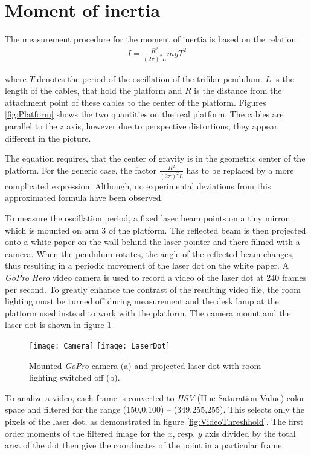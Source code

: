 \documentclass[journal]{IEEEtran}
\begin{document}
\section{Moment of inertia}

The measurement procedure for the moment of inertia is based on the relation \cite{report:ernest}
\begin{align}
	I = \frac{R^2}{(2\pi)^2 L} m g T^2
	\label{eq:I}
\end{align}

where $T$ denotes the period of the oscillation of the trifilar pendulum. $L$ is the length of the cables, that hold the platform and $R$ is the distance from the attachment point of these cables to the center of the platform. Figures \ref{fig:Platform} shows the two quantities on the real platform. The cables are parallel to the $z$ axis, however due to perspective distortions, they appear different in the picture.

The equation requires, that the center of gravity is in the geometric center of the platform.
For the generic case, the factor $\frac{R^2}{(2\pi)^2 L}$ has to be replaced by a more complicated expression.
Although, no experimental deviations from this approximated formula have been observed.

To measure the oscillation period, a fixed laser beam points on a tiny mirror, which is mounted on arm 3 of the platform.
The reflected beam is then projected onto a white paper on the wall behind the laser pointer and there filmed with a camera. 
When the pendulum rotates, the angle of the reflected beam changes, thus resulting in a periodic movement of the laser dot on the white paper.
A \emph{GoPro Hero} video camera is used to record a video of the laser dot at 240 frames per second.
To greatly enhance the contrast of the resulting video file, the room lighting must be turned off during measurement and the desk lamp at the platform used instead to work with the platform.
The camera mount and the laser dot is shown in figure \ref{fig:LaserDot}

\begin{figure}
	\centering
	\texttt{[image: Camera]}
	\texttt{[image: LaserDot]}
	\caption{Mounted \emph{GoPro} camera (a) and projected laser dot with room lighting switched off (b).}
	\label{fig:LaserDot}
\end{figure}

To analize a video, each frame is converted to \emph{HSV} (Hue-Saturation-Value) color space and filtered for the range (150,0,100) -- (349,255,255).
This selects only the pixels of the laser dot, as demonstrated in figure \ref{fig:VideoThreshhold}.
The first order moments of the filtered image for the $x$, resp. $y$ axis divided by the total area of the dot then give the coordinates of the point in a particular frame.
\end{document}
